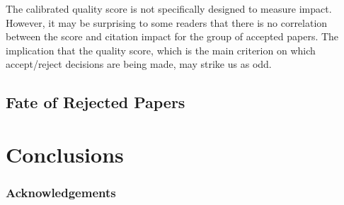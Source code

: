 \documentclass[twoside]{article}
\begin{document}
The calibrated quality score is not specifically designed to measure impact. However, it may be surprising to some readers that there is no correlation between the score and citation impact for the group of accepted papers. The implication that the quality score, which is the main criterion on which accept/reject decisions are being made, may strike us as odd. 

\subsection{Fate of Rejected Papers}

\section{Conclusions}

\subsubsection*{Acknowledgements}




\onecolumn
{}
\appendix


\vfill
\end{document}
